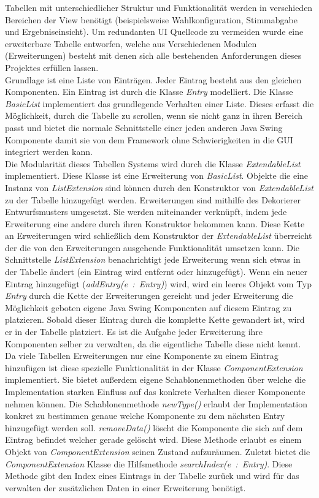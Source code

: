 \documentclass[parskip=full]{scrartcl}
\newcommand{\textitx}[1]{\mbox{\textit{#1}}}
\begin{document}
		Tabellen mit unterschiedlicher Struktur und Funktionalität werden in verschieden Bereichen der View benötigt (beispielsweise Wahlkonfiguration, Stimmabgabe und Ergebniseinsicht). Um redundanten UI Quellcode zu vermeiden wurde eine erweiterbare Tabelle entworfen, welche aus Verschiedenen Modulen (Erweiterungen) besteht mit denen sich alle bestehenden Anforderungen dieses Projektes erfüllen lassen.
		\\
		Grundlage ist eine Liste von Einträgen. Jeder Eintrag besteht aus den gleichen Komponenten. Ein Eintrag ist durch die Klasse \textitx{Entry} modelliert. Die Klasse \textitx{BasicList} implementiert das grundlegende Verhalten einer Liste. Dieses erfasst die Möglichkeit, durch die Tabelle zu scrollen, wenn sie nicht ganz in ihren Bereich passt und bietet die normale Schnittstelle einer jeden anderen Java Swing Komponente damit sie von dem Framework ohne Schwierigkeiten in die GUI integriert werden kann.
		\\
		Die Modularität dieses Tabellen Systems wird durch die Klasse \textitx{ExtendableList} implementiert. Diese Klasse ist eine Erweiterung von \textitx{BasicList}. Objekte die eine Instanz von \textitx{ListExtension} sind können durch den Konstruktor von \textitx{ExtendableList} zu der Tabelle hinzugefügt werden. Erweiterungen sind mithilfe des Dekorierer Entwurfsmusters umgesetzt. Sie werden miteinander verknüpft, indem jede Erweiterung eine andere durch ihren Konstruktor bekommen kann. Diese Kette an Erweiterungen wird schließlich dem Konstruktor der \textitx{ExtendableList} überreicht der die von den Erweiterungen ausgehende Funktionalität umsetzen kann. Die Schnittstelle \textitx{ListExtension} benachrichtigt jede Erweiterung wenn sich etwas in der Tabelle ändert (ein Eintrag wird entfernt oder hinzugefügt). Wenn ein neuer Eintrag hinzugefügt (\textitx{addEntry(e : Entry)}) wird, wird ein leeres Objekt vom Typ \textitx{Entry} durch die Kette der Erweiterungen gereicht und jeder Erweiterung die Möglichkeit geboten eigene Java Swing Komponenten auf diesem Eintrag zu platzieren. Sobald dieser Eintrag durch die komplette Kette gewandert ist, wird er in der Tabelle platziert. Es ist die Aufgabe jeder Erweiterung ihre Komponenten selber zu verwalten, da die eigentliche Tabelle diese nicht kennt. Da viele Tabellen Erweiterungen nur eine Komponente zu einem Eintrag hinzufügen ist diese spezielle Funktionalität in der Klasse \textitx{ComponentExtension} implementiert. Sie bietet außerdem eigene Schablonenmethoden über welche die Implementation starken Einfluss auf das konkrete Verhalten dieser Komponente nehmen können. Die Schablonenmethode \textitx{newType()} erlaubt der Implementation konkret zu bestimmen genaue welche Komponente zu dem nächsten Entry hinzugefügt werden soll. \textitx{removeData()} löscht die Komponente die sich auf dem Eintrag befindet welcher gerade gelöscht wird. Diese Methode erlaubt es einem Objekt von \textitx{ComponentExtension} seinen Zustand aufzuräumen. Zuletzt bietet die \textitx{ComponentExtension} Klasse die Hilfsmethode \textitx{searchIndex(e : Entry)}. Diese Methode gibt den Index eines Eintrags in der Tabelle zurück und wird für das verwalten der zusätzlichen Daten in einer Erweiterung benötigt.
\end{document}

